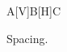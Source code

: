 \documentclass{article}
\renewcommand{\vspace}[1]{[V]}
\renewcommand{\hspace}[1]{[H]}
\begin{document}
\begin{figure}
A\vspace{1em}B\hspace{1em}C
\caption{Spacing.}
\end{figure}
\end{document}
